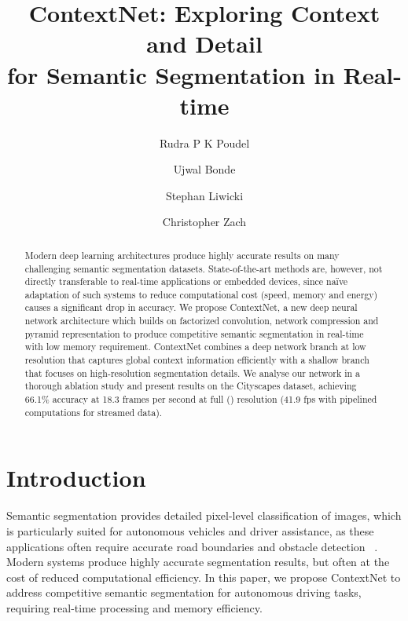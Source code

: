 \documentclass[runningheads]{llncs}
\begin{document}
\title{ContextNet: Exploring Context and Detail \\for Semantic Segmentation in Real-time}

\titlerunning{~}

\authorrunning{~}

\author{Rudra P K Poudel \and Ujwal Bonde \and Stephan Liwicki \and Christopher Zach}

\maketitle

\begin{abstract}
Modern deep learning architectures produce highly accurate results on many challenging semantic segmentation datasets. State-of-the-art methods are, however, not directly transferable to real-time applications or embedded devices, since na\"ive adaptation of such systems to reduce computational cost (speed, memory and energy) causes a significant drop in accuracy. We propose ContextNet, a new deep neural network architecture which builds on factorized convolution, network compression and pyramid representation to produce competitive semantic segmentation in real-time with low memory requirement. ContextNet combines a deep network branch at low resolution that captures global context information efficiently with a shallow branch that focuses on high-resolution segmentation details. We analyse our network in a thorough ablation study and present results on the Cityscapes dataset, achieving 66.1\% accuracy at 18.3 frames per second at full () resolution (41.9 fps with pipelined computations for streamed data).
\end{abstract}


\section{Introduction}
\label{sec:introduction}
Semantic segmentation provides detailed pixel-level classification of images, which is particularly suited for autonomous vehicles and driver assistance, as these applications often require accurate road boundaries and obstacle detection ~\cite{cityscaples2016,kitti2015,camvid-dataset2009}. Modern systems produce highly accurate segmentation results, but often at the cost of reduced computational efficiency. In this paper, we propose ContextNet to address competitive semantic segmentation for autonomous driving tasks, requiring real-time processing and memory efficiency.
\end{document}
